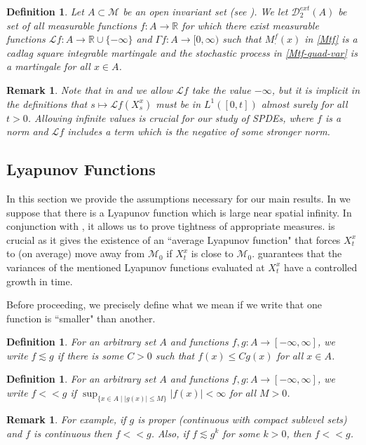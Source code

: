 \documentclass[final]{amsart}
\newtheorem{deff}[thm]{Definition}
\newtheorem{rem}[thm]{Remark}
\numberwithin{thm}{section}
\numberwithin{equation}{section}
\newcommand{\mcM}{\mathcal{M}}
\newcommand{\R}{\mathbb{R}}
\newcommand{\Dme}{\mathcal{D}^{ext}}
\newcommand{\Ll}{\mathcal{L}}
\begin{document}
\begin{deff}
    \label{D2}
   Let $A \subset \mcM$ be an open invariant set (see ). We let $\Dme_2(A)$ be set of all measurable functions $f:A \to \R$ for which there exist measurable functions $\mathcal{L}f: A \to \R \cup \{-\infty\}$ and $\Gamma f: A \to [0,\infty)$ such that $M^f_{\cdot}(x)$
   in \eqref{Mtf} is a cadlag square integrable martingale and the stochastic process in \eqref{Mtf-quad-var} is a martingale for all $x \in A$.
\end{deff}


\begin{rem}
    Note that in  and  we allow $\Ll f$ take the value $-\infty$, but it is implicit in the definitions that $s \mapsto \Ll f(X_s^x)$ must be in $L^1([0,t])$ almost surely for all $t > 0$. Allowing infinite values is crucial for our study of SPDEs, where $f$ is a norm and $\Ll f$ includes a term which is the negative of some stronger norm.
\end{rem}



\subsection{Lyapunov Functions}
\label{lyap}
In this section we provide the assumptions necessary for our main results. In  we suppose that there is a Lyapunov function which is large near spatial infinity. In conjunction with , it allows us to prove tightness of appropriate measures.  is crucial as it gives the existence of an ``average Lyapunov function" that forces $X_t^x$ to (on average) move away from $\mcM_0$ if $X_t^x$ is close to $\mcM_0$.  guarantees that the variances of the mentioned Lyapunov functions evaluated at $X_t^x$ have a controlled growth in time.
     
Before proceeding, we precisely define what we mean if we write that one function is ``smaller" than another. 

\begin{deff}\label{lesssim}
    For an arbitrary set $A$ and functions $f,g: A \to [-\infty,\infty]$, we write $f \lesssim g$ if there is some $C > 0$ such that $f(x) \leq Cg(x)$ for all $x \in A$.
\end{deff}

\begin{deff}\label{<<}
    For an arbitrary set $A$ and functions $f,g: A \to [-\infty,\infty]$, we write $f << g$ if $\sup_{\{x \in A \mid |g(x)| \leq M\}} |f(x)| < \infty$ for all $M > 0$.
\end{deff}
\begin{rem}
    For example, if $g$ is proper (continuous with compact sublevel sets) and $f$ is continuous then $f << g$. Also, if $f \lesssim g^k$ for some $k > 0$, then $f << g$.
\end{rem}
\end{document}
